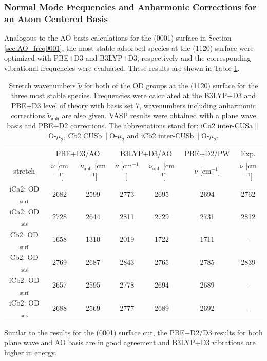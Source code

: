 \documentclass[11pt,DIV=13,BCOR=5mm,a4paper,headinclude]{scrbook}
\renewcommand{\vec}[1]{\underline{#1}}
\begin{document}
\subsubsection{Normal Mode Frequencies and Anharmonic Corrections for an Atom Centered Basis}
Analogous to the AO basis calculations for the (0001) surface in Section \ref{sec:AO_freq0001}, the most stable adsorbed species at the (11\=20) surface were optimized with PBE+D3 and B3LYP+D3, respectively and the corresponding vibrational frequencies were evaluated.
These results are shown in Table \ref{tab:freqs_11-20_crystal}.
\begin{table}[!h]
  \centering
  \caption{Stretch wavenumbers $\tilde{\nu}$ for both of the OD groups at the (11\=20) surface for the three most stable species.
Frequencies were calculated at the B3LYP+D3 and PBE+D3 level of theory with basis set 7, wavenumbers including anharmonic corrections $\tilde{\nu}_\textrm{anh}$ are also given.
VASP results were obtained with a plane wave basis and PBE+D2 corrections.
The abbreviations stand for: iCa2 inter-CUSa$\parallel$O-$\mu_2$, Cb2 CUSb$\parallel$O-$\mu_2$ and iCb2 inter-CUSb$\parallel$O-$\mu_2$.}
  \begin{tabular}{ccc|cc|c|c}
  \toprule
   & \multicolumn{2}{c}{PBE+D3/AO} & \multicolumn{2}{c}{B3LYP+D3/AO} &PBE+D2/PW&Exp.\cite{Heiden11-20_2018}\\
  stretch & $\tilde{\nu}$ [cm$^{-1}$] &$\tilde{\nu}_\textrm{anh}$ [cm$^{-1}$] &$\tilde{\nu}$ [cm$^{-1}$] & $\tilde{\nu}_\textrm{anh}$ [cm$^{-1}$]&$\tilde{\nu}$ [cm$^{-1}$]&$\tilde{\nu}$ [cm$^{-1}$]\\\midrule
  iCa2: OD$_{\textrm{surf}}$ &2682 &2599 &2773 &2695 & 2694&2762\\
  iCa2: OD$_{\textrm{ads}}$  &2728 &2644 &2811 &2729 & 2731&2812\\
  Cb2: OD$_{\textrm{surf}}$  &1658 &1310 &2019 &1722 & 1711&-\\
  Cb2: OD$_{\textrm{ads}}$   &2769 &2687 &2843 &2765 & 2785&2839\\
  iCb2: OD$_{\textrm{surf}}$ &2657 &2595 &2778 &2694 & 2689&-\\
  iCb2: OD$_{\textrm{ads}}$  &2688 &2569 &2777 &2689 & 2692&-\\\bottomrule
  \end{tabular}
  \label{tab:freqs_11-20_crystal}
\end{table}
Similar to the results for the (0001) surface cut, the PBE+D2/D3 results for both plane wave and AO basis are in good agreement and B3LYP+D3 vibrations are higher in energy.
\end{document}
